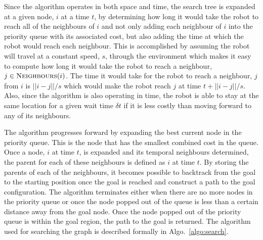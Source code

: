 \documentclass[letterpaper, 10pt, conference]{ieeeconf}
\newcommand{\Function}[1]{\ensuremath{{ \textsc{#1}}}}
\begin{document}
Since the algorithm operates in both space and time, the search tree is
expanded at a given node, $i$ at a time $t$, by determining how long it would
take the robot to reach all of the neighbours of $i$ and not only adding each
neighbour of $i$ into the priority queue with its associated cost, but also
adding the time at which the robot would reach each neighbour. This is
accomplished by assuming the robot will travel at a constant speed, $s$,
through the environment which makes it easy to compute how long it would take
the robot to reach a neighbour, $j \in \Function{Neighbours}(i)$. The time it
would take for the robot to reach a neighbour, $j$ from $i$ is $||i - j|| / s$
which would make the robot reach $j$ at time $t + ||i - j|| / s$.  Also, since
the algorithm is also operating in time, the robot is able to stay at the same
location for a given wait time $\delta t$ if it is less costly than moving
forward to any of its neighbours.

The algorithm progresses forward by expanding the best current node in the
priority queue. This is the node that has the smallest combined cost in the
queue.  Once a node, $i$ at time $t$, is expanded and its temporal neighbours
determined, the parent for each of these neighbours is defined as $i$ at time
$t$. By storing the parents of each of the neighbours, it becomes possible to
backtrack from the goal to the starting position once the goal is reached and
construct a path to the goal configuration. The algorithm terminates either
when there are no more nodes in the priority queue or once the node popped out
of the queue is less than a certain distance away from the goal node. Once the
node popped out of the priority queue is within the goal region, the path to
the goal is returned. The algorithm used for searching the graph is described
formally in Algo.~\ref{algo:search}.
\end{document}
